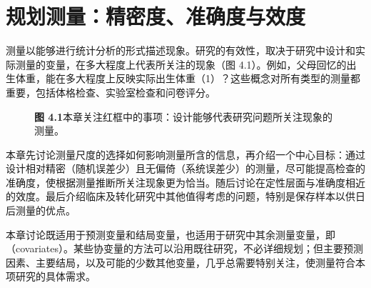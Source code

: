\chapter{规划测量：精密度、准确度与效度}

测量以能够进行统计分析的形式描述现象。研究的有效性，取决于研究中设计和实际测量的变量，在多大程度上代表所关注的现象（图 4.1）。例如，父母回忆的出生体重，能在多大程度上反映实际出生体重（1）？这些概念对所有类型的测量都重要，包括体格检查、实验室检查和问卷评分。
\par
\begin{figure}[htbp]\centering\resizebox{\linewidth}{!}{\chfouroverview}
\caption*{\textbf{图 4.1}\quad 本章关注红框中的事项：设计能够代表研究问题所关注现象的测量。}
\end{figure}\par
{}
本章先讨论测量尺度的选择如何影响测量所含的信息，再介绍一个中心目标：通过设计相对精密（随机误差少）且无偏倚（系统误差少）的测量，尽可能提高检查的准确度，使根据测量推断所关注现象更为恰当。随后讨论在定性层面与准确度相近的效度。最后介绍临床及转化研究中其他值得考虑的问题，特别是保存样本以供日后测量的优点。

本章讨论既适用于预测变量和结局变量，也适用于研究中其余测量变量，即（covariates）。某些协变量的方法可以沿用既往研究，不必详细规划；但主要预测因素、主要结局，以及可能的少数其他变量，几乎总需要特别关注，使测量符合本项研究的具体需求。

